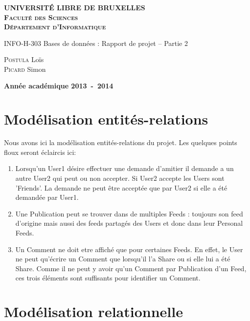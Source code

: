 \documentclass[a4paper,10pt]{article}
\begin{document}
\begin{titlepage}
	\begin{center}
	\textbf{\textsc{UNIVERSIT\'E LIBRE DE BRUXELLES}}\\
	\textbf{\textsc{Faculté des Sciences}}\\
	\textbf{\textsc{Département d'Informatique}}
	\vfill{}\vfill{}
	\begin{center}{\Huge INFO-H-303 Bases de données : Rapport de projet -- Partie 2}\end{center}{\Huge \par}
	\begin{center}{\large \textsc{Postula} Loïs \\\textsc{Picard} Simon}\end{center}{\Huge \par}
	\vfill{}\vfill{}
	\vfill{}\vfill{}\enlargethispage{3cm}
	\textbf{Année académique 2013~-~2014}
	\end{center}
	\end{titlepage}
	
    \pagebreak

    \section{Modélisation entités-relations}

    Nous avons ici la modélisation entités-relations du projet. Les quelques points floux seront éclaircis ici:
    
    \begin{enumerate}
	\item Lorsqu'un User1 désire effectuer une demande d'amitier il demande a un autre User2 qui peut ou non accepter. Si User2 accepte les Users sont 'Friends'. La demande ne peut être acceptée que par User2 si elle
	a été demandée par User1.
	\item Une Publication peut se trouver dans de multiples Feeds : toujours son feed d'origine mais aussi des feeds partagés des Users et donc dans leur Personal Feeds.
	\item Un Comment ne doit etre affiché que pour certaines Feeds. En effet, le User ne peut qu'écrire un Comment que lorsqu'il l'a Share ou si elle lui a été Share. Comme il ne peut y avoir qu'un Comment par Publication d'un Feed, ces trois éléments sont suffisants pour identifier un Comment.
    \end{enumerate}

    \section{Modélisation relationnelle}
\end{document}
